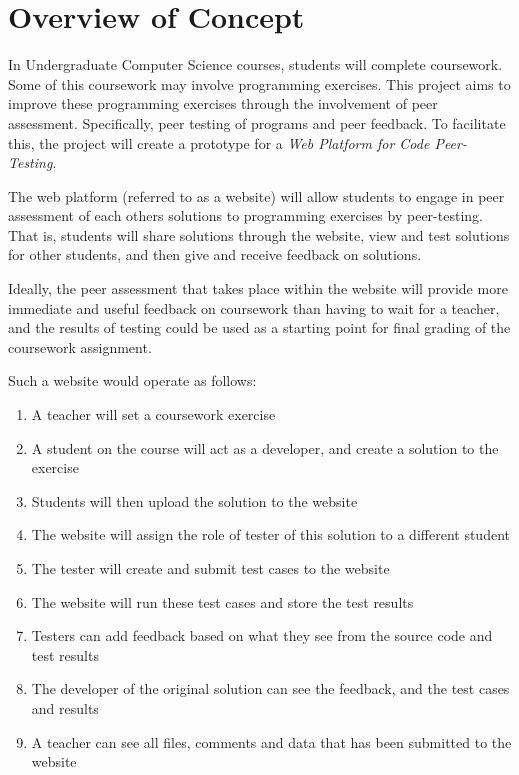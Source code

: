 \documentclass[a4paper,11pt]{report}
\begin{document}
\section{Overview of Concept}
In Undergraduate Computer Science courses, students will complete coursework. Some of this coursework may involve programming exercises. This project aims to improve these programming exercises through the involvement of peer assessment. Specifically, peer testing of programs and peer feedback. To facilitate this, the project will create a prototype for a \textit{Web Platform for Code Peer-Testing}.\par
The web platform (referred to as a website) will allow students to engage in peer assessment of each others solutions to programming exercises by peer-testing. That is, students will share solutions through the website, view and test solutions for other students, and then give and receive feedback on solutions.\par
Ideally, the peer assessment that takes place within the website will provide more immediate and useful feedback on coursework than having to wait for a teacher, and the results of testing could be used as a starting point for final grading of the coursework assignment.\par
Such a website would operate as follows:
\begin{enumerate}
	\item A teacher will set a coursework exercise
	\item A student on the course will act as a developer, and create a solution to the exercise
	\item Students will then upload the solution to the website
	\item The website will assign the role of tester of this solution to a different student
	\item The tester will create and submit test cases to the website
	\item The website will run these test cases and store the test results
	\item Testers can add feedback based on what they see from the source code and test results
	\item The developer of the original solution can see the feedback, and the test cases and results
	\item A teacher can see all files, comments and data that has been submitted to the website 
\end{enumerate}
\end{document}
